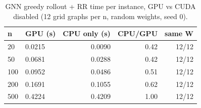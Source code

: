 \begin{table}[t]
\centering
\caption{GNN greedy rollout + RR time per instance, GPU vs CUDA disabled (12 grid graphs per n, random weights, seed 0).}
\label{tab:inference_time}
\scriptsize
\begin{tabular}{llrrr}
\toprule
n & GPU (s) & CPU only (s) & CPU/GPU & same W \\
\midrule
20 & 0.0215 & 0.0090 & 0.42 & 12/12 \\
50 & 0.0681 & 0.0288 & 0.42 & 12/12 \\
100 & 0.0952 & 0.0486 & 0.51 & 12/12 \\
200 & 0.1691 & 0.1055 & 0.62 & 12/12 \\
500 & 0.4224 & 0.4209 & 1.00 & 12/12 \\
\bottomrule
\end{tabular}
\end{table}
